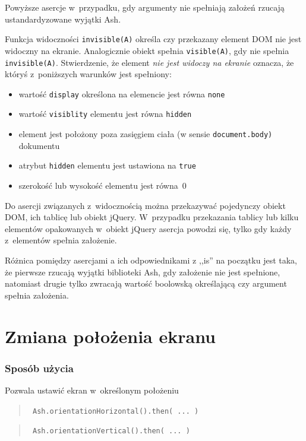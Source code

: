 \documentclass[brudnopis]{xmgr}
\begin{document}
Powyższe asercje w~przypadku, gdy argumenty nie spełniają założeń rzucają ustandardyzowane wyjątki Ash. 

Funkcja widoczności \texttt{invisible(A)} określa czy przekazany element DOM nie jest widoczny na ekranie. Analogicznie obiekt spełnia \texttt{visible(A)}, gdy nie spełnia \texttt{invisible(A)}. Stwierdzenie, że element {\it nie jest widoczy na ekranie} oznacza, że któryś z~poniższych warunków jest spełniony:

\begin{itemize}
  \item wartość \texttt{display} określona na elemencie jest równa \texttt{none}
  \item wartość \texttt{visiblity} elementu jest równa \texttt{hidden}
  \item element jest położony poza zasięgiem ciała (w sensie \texttt{document.body)} dokumentu
  \item atrybut \texttt{hidden} elementu jest ustawiona na \texttt{true}
  \item szerokość lub wysokość elementu jest równa~0
\end{itemize}

Do asercji związanych z~widocznością można przekazywać pojedynczy obiekt DOM, ich tablicę lub obiekt jQuery. W~przypadku przekazania tablicy lub kilku elementów opakowanych w~obiekt jQuery asercja powodzi się, tylko gdy każdy z~elementów spełnia założenie. 

Różnica pomiędzy asercjami a ich odpowiednikami z ,,is'' na początku jest taka, że pierwsze rzucają wyjątki biblioteki Ash, gdy założenie nie jest spełnione, natomiast drugie tylko zwracają wartość boolowską określającą czy argument spełnia założenia.  

\section{Zmiana położenia ekranu}

\subsubsection{Sposób użycia}
Pozwala ustawić ekran w~określonym położeniu

\begin{quote}
  \texttt{  Ash.orientationHorizontal().then( ... )  }
\end{quote}

\begin{quote}
  \texttt{  Ash.orientationVertical().then( ... )  } 
\end{quote}
\end{document}
